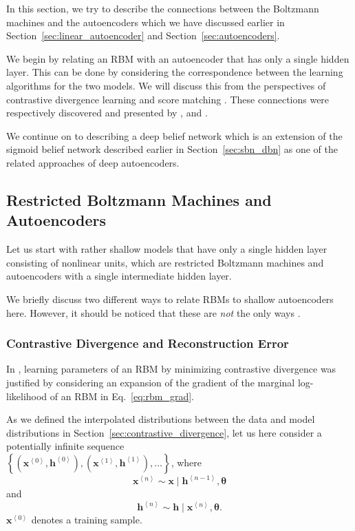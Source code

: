 \documentclass[dissertation,nocontribution,draft*]{aaltoseries}
\newcommand{\qt}[1]{\left<#1\right>}
\newcommand{\vect}[1]{\mathbf{#1}}
\newcommand{\vects}[1]{\boldsymbol{#1}}
\newcommand{\vh}[0]{\vect{h}}
\newcommand{\vx}[0]{\vect{x}}
\newcommand{\TT}[0]{{\vects{\theta}}}
\begin{document}
In this section, we try to describe the connections between
the Boltzmann machines and the autoencoders which we have
discussed earlier in Section~\ref{sec:linear_autoencoder}
and Section~\ref{sec:autoencoders}.

We begin by relating an RBM with an autoencoder that has
only a single hidden layer. This can be done by considering
the correspondence between the learning algorithms for the
two models. We will discuss this from the perspectives of contrastive
divergence learning and score matching
\citep{Hyvarinen2005}. These connections were respectively
discovered and presented by \citet{Bengio2009},
\citet{Swersky2011} and \citet{Vincent2011}.

We continue on to describing a deep belief network
\citep{Hinton2006nc} which is an extension of the sigmoid
belief network described earlier in
Section~\ref{sec:sbn_dbn} as one of the related approaches
of deep autoencoders. 

\subsection{Restricted Boltzmann Machines and Autoencoders}
\label{sec:rbm_aenc}

Let us start with rather shallow models that have only a
single hidden layer consisting of nonlinear units, which are
restricted Boltzmann machines and autoencoders with a single
intermediate hidden layer. 

We briefly discuss two different ways to relate RBMs to
shallow autoencoders here. However, it should be noticed
that these are \textit{not} the only ways \citep[see,
e.g.,][for another interpretation that unifies RBMs and
autoencoders]{Ranzato2007a}.

\subsubsection{Contrastive Divergence and Reconstruction Error}
\label{sec:cd_rerr}

In \citep{Bengio2009}, learning parameters of an RBM by
minimizing contrastive divergence was justified by
considering an expansion of the gradient of the marginal
log-likelihood of an RBM in Eq.~\eqref{eq:rbm_grad}. 

As we defined the interpolated distributions between the
data and model distributions in
Section~\ref{sec:contrastive_divergence}, let us here
consider a potentially infinite sequence \\
$\left\{
\left(\vx^{\qt{0}}, \vh^{\qt{0}}\right),
\left(\vx^{\qt{1}},
\vh^{\qt{1}}\right), \dots \right\}$, where
\[
\vx^{\qt{n}} \sim \vx \mid \vh^{\qt{n-1}}, \TT
\]
and
\[
\vh^{\qt{n}} \sim \vh \mid \vx^{\qt{n}}, \TT.
\]
$\vx^{\qt{0}}$ denotes a training sample.
\end{document}
